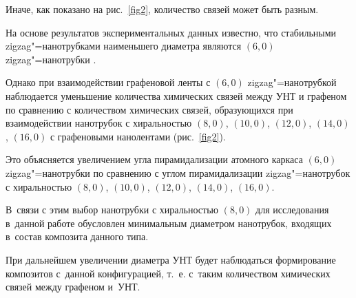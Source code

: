 Иначе, как показано на рис.~\ref{fig2}, количество связей может быть разным. 

На основе результатов экспериментальных данных известно, что стабильными zigzag"=нанотрубками наименьшего диаметра являются $(6,0)$ zigzag"=нанотрубки \cite{kol:bib17}. 

Однако при взаимодействии графеновой ленты с $(6,0)$ zigzag"=нанотрубкой наблюдается уменьшение количества химических связей между УНТ и графеном по сравнению с количеством химических связей, образующихся при взаимодействии нанотрубок с хиральностью $(8,0)$, $(10,0)$, $(12,0)$, $(14,0)$, $(16,0)$ с графеновыми нанолентами (рис.~\ref{fig2}). 

Это объясняется увеличением угла пирамидализации атомного каркаса $(6,0)$ zigzag"=нанотрубки по сравнению с углом пирамидализации zigzag"=нанотрубок с хиральностью $(8,0)$, $(10,0)$, $(12,0)$, $(14,0)$, $(16,0)$. 

В~связи с этим выбор нанотрубки с хиральностью  $(8,0)$ для исследования в~данной работе обусловлен минимальным диаметром нанотрубок, входящих в~состав композита данного типа. 

При дальнейшем увеличении диаметра УНТ будет наблюдаться формирование композитов с~данной конфигурацией, т.~е. с~таким количеством химических связей между графеном и~УНТ.













%


